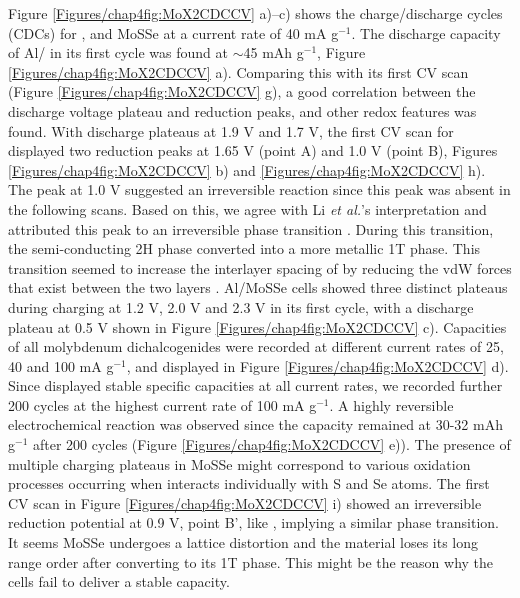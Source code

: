 Figure \ref{Figures/chap4fig:MoX2CDCCV} a)--c) shows the charge/discharge cycles (CDCs) for ,  and MoSSe at a current rate of 40 mA g$^{-1}$. The discharge capacity of Al/ in its first cycle was found at $\sim$45 mAh g$^{-1}$, Figure \ref{Figures/chap4fig:MoX2CDCCV} a). Comparing this with its first CV scan (Figure \ref{Figures/chap4fig:MoX2CDCCV} g), a good correlation between the discharge voltage plateau and reduction peaks, and other redox features was found. With discharge plateaus at 1.9 V and 1.7 V, the first CV scan for  displayed two reduction peaks at 1.65 V (point A) and 1.0 V (point B), Figures \ref{Figures/chap4fig:MoX2CDCCV} b) and \ref{Figures/chap4fig:MoX2CDCCV} h). The peak at 1.0 V suggested an irreversible reaction since this peak was absent in the following scans. Based on this, we agree with Li \textit{et al.}'s interpretation and attributed this peak to an irreversible phase transition \cite{li_enhancing_2015}. During this transition, the semi-conducting 2H phase converted into a more metallic 1T phase. This transition seemed to increase the interlayer spacing of  by reducing the vdW forces that exist between the two layers \cite{fan_hybrid_2017}. Al/MoSSe cells showed three distinct plateaus during charging at 1.2 V, 2.0 V and 2.3 V in its first cycle, with a discharge plateau at 0.5 V shown in Figure \ref{Figures/chap4fig:MoX2CDCCV} c). Capacities of all molybdenum dichalcogenides were recorded at different current rates of 25, 40 and 100 mA g$^{-1}$, and displayed in Figure \ref{Figures/chap4fig:MoX2CDCCV} d). Since  displayed stable specific capacities at all current rates, we recorded further 200 cycles at the highest current rate of 100 mA g$^{-1}$. A highly reversible electrochemical reaction was observed since the capacity remained at 30-32 mAh g$^{-1}$ after 200 cycles (Figure \ref{Figures/chap4fig:MoX2CDCCV} e)). The presence of multiple charging plateaus in MoSSe might correspond to various oxidation processes occurring when  interacts individually with S and Se atoms. The first CV scan in Figure \ref{Figures/chap4fig:MoX2CDCCV} i) showed an irreversible reduction potential at 0.9 V, point B', like , implying a similar phase transition. It seems MoSSe undergoes a lattice distortion and the material loses its long range order after converting to its 1T phase. This might be the reason why the cells fail to deliver a stable capacity.

